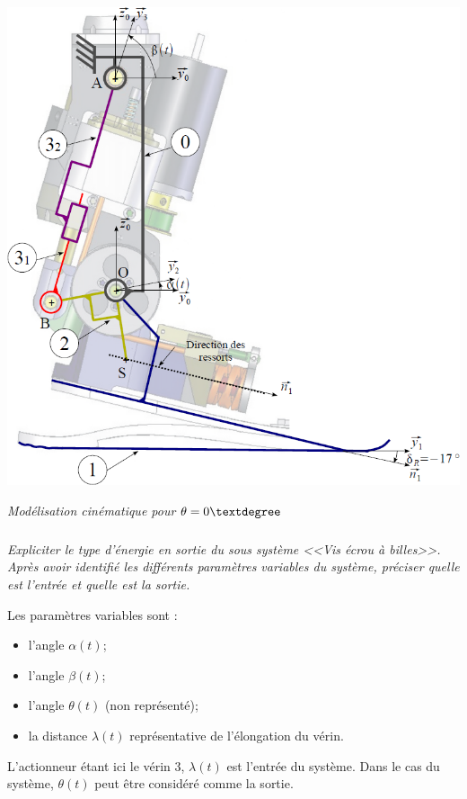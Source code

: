 \documentclass[10pt]{article}
\newif\ifprof
\begin{document}
\begin{minipage}[c]{.43\linewidth}
\begin{center}
\includegraphics[width=\textwidth]{images/prot_03}

\textit{Modélisation cinématique pour $\theta=0\textdegree$}
\end{center}
\end{minipage}

\fi

\subparagraph{}
\textit{Expliciter le type d'énergie en sortie du sous système <<Vis écrou à billes>>. Après avoir identifié les différents paramètres variables du système, préciser quelle est l'entrée et quelle est la sortie.}%

\ifprof
\begin{corrige}
Les paramètres variables sont :
\begin{itemize}
\item l'angle $\alpha(t)$;
\item l'angle $\beta(t)$;
\item l'angle $\theta(t)$ (non représenté);
\item la distance $\lambda(t)$ représentative de l'élongation du vérin. 
\end{itemize}

L'actionneur étant ici le vérin 3, $\lambda(t)$ est l'entrée du système.  Dans le cas du système,  	$\theta(t)$ peut être considéré comme la sortie. 
\end{corrige}
\end{document}
